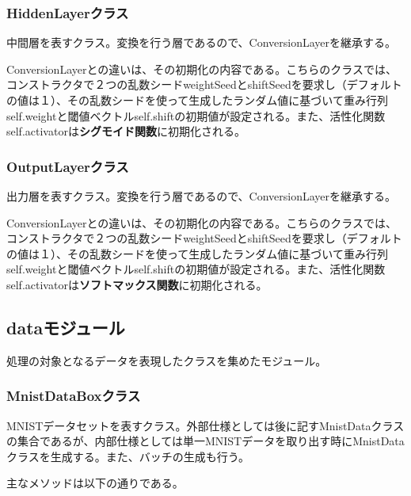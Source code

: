 \documentclass{ujarticle} %
\begin{document}
\subsubsection{HiddenLayerクラス}
中間層を表すクラス。変換を行う層であるので、ConversionLayerを継承する。

ConversionLayerとの違いは、その初期化の内容である。こちらのクラスでは、コンストラクタで２つの乱数シードweightSeedとshiftSeedを要求し（デフォルトの値は１）、その乱数シードを使って生成したランダム値に基づいて重み行列self.weightと閾値ベクトルself.shiftの初期値が設定される。また、活性化関数self.activatorは\textbf{シグモイド関数}に初期化される。

\subsubsection{OutputLayerクラス}
出力層を表すクラス。変換を行う層であるので、ConversionLayerを継承する。

ConversionLayerとの違いは、その初期化の内容である。こちらのクラスでは、コンストラクタで２つの乱数シードweightSeedとshiftSeedを要求し（デフォルトの値は１）、その乱数シードを使って生成したランダム値に基づいて重み行列self.weightと閾値ベクトルself.shiftの初期値が設定される。また、活性化関数self.activatorは\textbf{ソフトマックス関数}に初期化される。

\subsection{dataモジュール}
処理の対象となるデータを表現したクラスを集めたモジュール。

\subsubsection{MnistDataBoxクラス}
MNISTデータセットを表すクラス。外部仕様としては後に記すMnistDataクラスの集合であるが、内部仕様としては単一MNISTデータを取り出す時にMnistDataクラスを生成する。また、バッチの生成も行う。

主なメソッドは以下の通りである。
\end{document}
